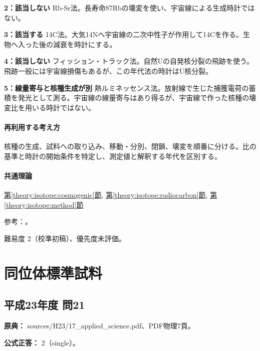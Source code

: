 \noindent\textbf{2：該当しない} Rb-Sr法。長寿命87Rbの壊変を使い、宇宙線による生成時計ではない。\par

\noindent\textbf{3：該当する} 14C法。大気14Nへ宇宙線の二次中性子が作用して14Cを作る。生物へ入った後の減衰を時計にする。\par

\noindent\textbf{4：該当しない} フィッション・トラック法。自然Uの自発核分裂の飛跡を使う。飛跡一般には宇宙線損傷もあるが、この年代法の時計はU核分裂。\par

\noindent\textbf{5：線量寄与と核種生成が別} 熱ルミネッセンス法。放射線で生じた捕獲電荷の蓄積を発光として測る。宇宙線の線量寄与はあり得るが、宇宙線で作った核種の壊変比を用いる時計ではない。\par

\paragraph{再利用する考え方} 核種の生成、試料への取り込み、移動・分別、閉鎖、壊変を順番に分ける。比の基準と時計の開始条件を特定し、測定値と解釈する年代を区別する。

\paragraph{共通理論} \hyperref[theory:isotope:cosmogenic]{第\ref*{theory:isotope:cosmogenic}節}, \hyperref[theory:isotope:radiocarbon]{第\ref*{theory:isotope:radiocarbon}節}, \hyperref[theory:isotope:method]{第\ref*{theory:isotope:method}節}

\par 参考：\cite{iso_radiometric}。

\par 難易度 2（校準初稿）、優先度未評価。

\section{同位体標準試料}

\subsection{平成23年度 問21}
\label{q:h23-reg-applied-21}

\noindent\textbf{原典：} sources/H23/17\_applied\_science.pdf、PDF物理7頁。

\textbf{公式正答：} 2（single）。

